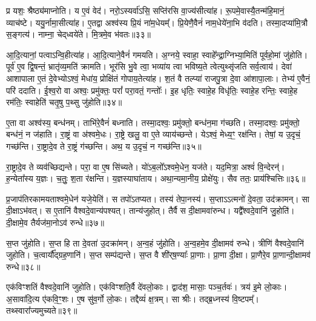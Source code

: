 प्र यशः॒ श्रैष्ठ्य॑माप्नोति।
य ए॒वं वेद॑।
नरो॒ऽस्यर्वा॑ऽसि॒ सप्ति॑रसि वा॒ज्य॑सीत्या॑ह।
रू॒पमे॒वास्यै॒तन्म॑हि॒मानं॒ व्याच॑ष्टे।
ययु॒र्नामा॒सीत्या॑ह।
ए॒तद्वा अश्व॑स्य प्रि॒यं ना॑म॒धेयम्᳚।
प्रि॒येणै॒वैनं॑ नाम॒धेये॑ना॒भि व॑दति।
तस्मा॒दप्या॑मि॒त्रौ स॒ङ्गत्य॑।
नाम्ना॒ चेद्‌ध्वये॑ते।
मि॒त्रमे॒व भ॑वतः॥३३॥\ip

आ॒दि॒त्यानां॒ पत्वा\-ऽन्वि॒हीत्या॑ह।
आ॒दि॒त्याने॒वैनं॑ गमयति।
अ॒ग्नये॒ स्वाहा॒ स्वाहे᳚न्द्रा॒ग्निभ्या॒मिति॑ पूर्वहो॒मां जु॑होति।
पूर्व॑ ए॒व द्वि॒षन्तं॒ भ्रातृ॑व्य॒मति॑ क्रामति।
भूर॑सि भु॒वे त्वा॒ भव्या॑य त्वा भविष्य॒ते त्वेत्युथ्सृ॑जति सर्व॒त्वाय॑।
देवा॑ आशापाला ए॒तं दे॒वेभ्यो\-ऽश्वं॒ मेधा॑य॒ प्रोक्षि॑तं गोपाय॒तेत्या॑ह।
श॒तं वै तल्प्या॑ राजपु॒त्रा दे॒वा आ॑शापा॒लाः।
तेभ्य॑ ए॒वैनं॒ परि॑ ददाति।
ई॒श्व॒रो वा अश्वः॒ प्रमु॑क्तः॒ परां᳚ परा॒वतं॒ गन्तोः᳚।
इ॒ह धृतिः॒ स्वाहे॒ह विधृ॑तिः॒ स्वाहे॒ह रन्तिः॒ स्वाहे॒ह रम॑तिः॒ स्वाहेति॑ चतृ॒षु प॒थ्सु जु॑होति॥३४॥\ip

ए॒ता वा अश्व॑स्य॒ बन्ध॑नम्।
ताभि॑रे॒वैनं॑ बध्नाति।
तस्मा॒दश्वः॒ प्रमु॑क्तो॒ बन्ध॑न॒मा ग॑च्छति।
तस्मा॒दश्वः॒ प्रमु॑क्तो॒ बन्ध॑नं॒ न ज॑हाति।
रा॒ष्ट्रं वा अ॑श्वमे॒धः।
रा॒ष्ट्रे खलु॒ वा ए॒ते व्याय॑च्छन्ते।
येऽश्वं॒ मेध्य॒ꣳ॒ रक्ष॑न्ति।
तेषां॒ य उ॒दृचं॒ गच्छ॑न्ति।
रा॒ष्ट्रादे॒व ते रा॒ष्ट्रं ग॑च्छन्ति।
अथ॒ य उ॒दृचं॒ न गच्छ॑न्ति॥३५॥\ip

रा॒ष्ट्रादे॒व ते व्यव॑च्छिद्यन्ते।
परा॒ वा ए॒ष सि॑च्यते।
यो॑ऽब॒लो᳚\-ऽश्वमे॒धेन॒ यज॑ते।
यद॒मित्रा॒ अश्वं॑ वि॒न्देरन्॑।
ह॒न्येता᳚स्य य॒ज्ञः।
च॒तुः॒ श॒ता र॑क्षन्ति।
य॒ज्ञस्याघा॑ताय।
अथा॒न्यमा॒नीय॒ प्रोक्षे॑युः।
सैव ततः॒ प्राय॑श्चित्तिः॥३६॥\ip\anuvakamend[ग॒च्छ॒ति॒ भ॒व॒तः॒ प॒थ्सु जु॑होति॒ न गच्छ॑न्ति॒ नव॑ च]

प्र॒जा\-प॑तिरकामयताश्वमे॒धेन॑ यजे॒येति॑।
स तपो॑\-ऽतप्यत।
तस्य॑ तेपा॒नस्य॑।
स॒प्ताऽऽत्मनो॑ दे॒वता॒ उद॑क्रामन्।
सा दी॒क्षा\-ऽभ॑वत्।
स ए॒तानि॑ वैश्वदे॒वान्य॑पश्यत्।
तान्य॑जुहोत्।
तैर्वै स दी॒क्षामवा॑रुन्ध।
यद्वै᳚श्वदे॒वानि॑ जु॒होति॑।
दी॒क्षामे॒व तैर्यज॑मा॒नोऽव॑ रुन्धे॥३७॥\ip

स॒प्त जु॑होति।
स॒प्त हि ता दे॒वता॑ उ॒दक्रा॑मन्।
अ॒न्व॒हं जु॑होति।
अ॒न्व॒हमे॒व दी॒क्षामव॑ रुन्धे।
त्रीणि॑ वैश्वदे॒वानि॑ जुहोति।
च॒त्वार्यौ᳚द्ग्रह॒णानि॑।
स॒प्त सम्प॑द्यन्ते।
स॒प्त वै शी॑र्‌\mbox{}ष॒ण्याः᳚ प्रा॒णाः।
प्रा॒णा दी॒क्षा।
प्रा॒णैरे॒व प्रा॒णान्दी॒क्षामव॑ रुन्धे॥३८॥\ip

एक॑विꣳशतिं वैश्वदे॒वानि॑ जुहोति।
एक॑विꣳशति॒र्वै दे॑वलो॒काः।
द्वाद॑श॒ मासाः॒ पञ्च॒र्तवः॑।
त्रय॑ इ॒मे लो॒काः।
अ॒सावा॑दि॒त्य ए॑कवि॒ꣳ॒शः।
ए॒ष सु॑व॒र्गो लो॒कः।
तद्दैव्यं॑ क्ष॒त्रम्।
सा श्रीः।
तद्ब्र॒ध्नस्य॑ वि॒ष्टपम्᳚।
तथ्स्वारा᳚ज्यमुच्यते॥३९॥\ip

